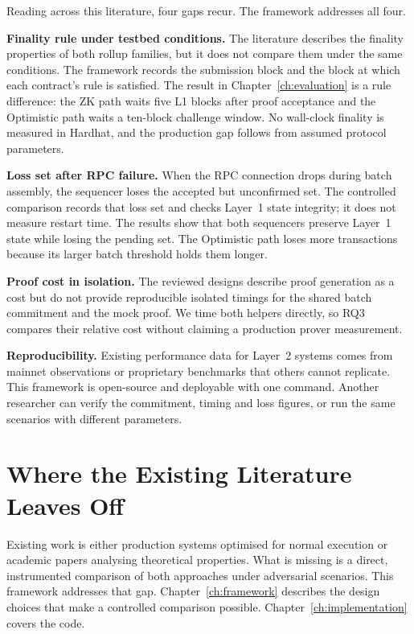Reading across this literature, four gaps recur. The framework addresses all four.

\textbf{Finality rule under testbed conditions.} The literature describes the finality properties of both rollup families, but it does not compare them under the same conditions. The framework records the submission block and the block at which each contract's rule is satisfied. The result in Chapter~\ref{ch:evaluation} is a rule difference: the ZK path waits five L1 blocks after proof acceptance and the Optimistic path waits a ten-block challenge window. No wall-clock finality is measured in Hardhat, and the production gap follows from assumed protocol parameters.

\textbf{Loss set after RPC failure.} When the RPC connection drops during batch assembly, the sequencer loses the accepted but unconfirmed set. The controlled comparison records that loss set and checks Layer~1 state integrity; it does not measure restart time. The results show that both sequencers preserve Layer~1 state while losing the pending set. The Optimistic path loses more transactions because its larger batch threshold holds them longer.

\textbf{Proof cost in isolation.} The reviewed designs describe proof generation as a cost but do not provide reproducible isolated timings for the shared batch commitment and the mock proof. We time both helpers directly, so RQ3 compares their relative cost without claiming a production prover measurement.

\textbf{Reproducibility.} Existing performance data for Layer~2 systems comes from mainnet observations or proprietary benchmarks that others cannot replicate. This framework is open-source and deployable with one command. Another researcher can verify the commitment, timing and loss figures, or run the same scenarios with different parameters.

\section{Where the Existing Literature Leaves Off}

Existing work is either production systems optimised for normal execution or academic papers analysing theoretical properties. What is missing is a direct, instrumented comparison of both approaches under adversarial scenarios. This framework addresses that gap.
Chapter~\ref{ch:framework} describes the design choices that make a controlled comparison possible. Chapter~\ref{ch:implementation} covers the code.
